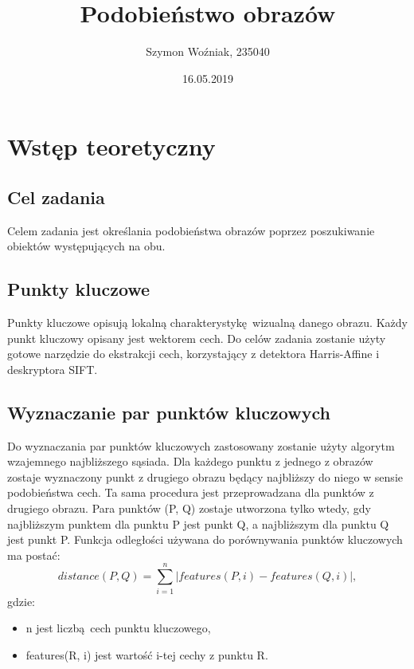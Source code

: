 \documentclass{article}
\author{Szymon Woźniak, 235040}
\date{16.05.2019}
\title{Podobieństwo obrazów}
\begin{document}
	\maketitle
	\newpage
	
	\section{Wstęp teoretyczny}
	\subsection{Cel zadania}
	Celem zadania jest określania podobieństwa obrazów poprzez poszukiwanie obiektów występujących na obu.
	
	\subsection{Punkty kluczowe}
	Punkty kluczowe opisują lokalną charakterystykę wizualną danego obrazu. Każdy punkt kluczowy opisany jest wektorem cech. Do celów zadania zostanie użyty gotowe narzędzie do ekstrakcji cech, korzystający z detektora Harris-Affine i deskryptora SIFT.
	\subsection{Wyznaczanie par punktów kluczowych}
	Do wyznaczania par punktów kluczowych zastosowany zostanie użyty algorytm wzajemnego najbliższego sąsiada. Dla każdego punktu z jednego z obrazów zostaje wyznaczony punkt z drugiego obrazu będący najbliższy do niego w sensie podobieństwa cech. Ta sama procedura jest przeprowadzana dla punktów z drugiego obrazu. Para punktów (P, Q) zostaje utworzona tylko wtedy, gdy najbliższym punktem dla punktu P jest punkt Q, a najbliższym dla punktu Q jest punkt P. Funkcja odległości używana do porównywania punktów kluczowych ma postać:
	\begin{equation}
		distance(P, Q) = \sum_{i=1}^{n} |features(P, i) - features(Q, i)|,
	\end{equation}
	gdzie:
	\begin{itemize}
		\item n jest liczbą cech punktu kluczowego,
		\item features(R, i) jest wartość i-tej cechy z punktu R.
	\end{itemize}
\end{document}
